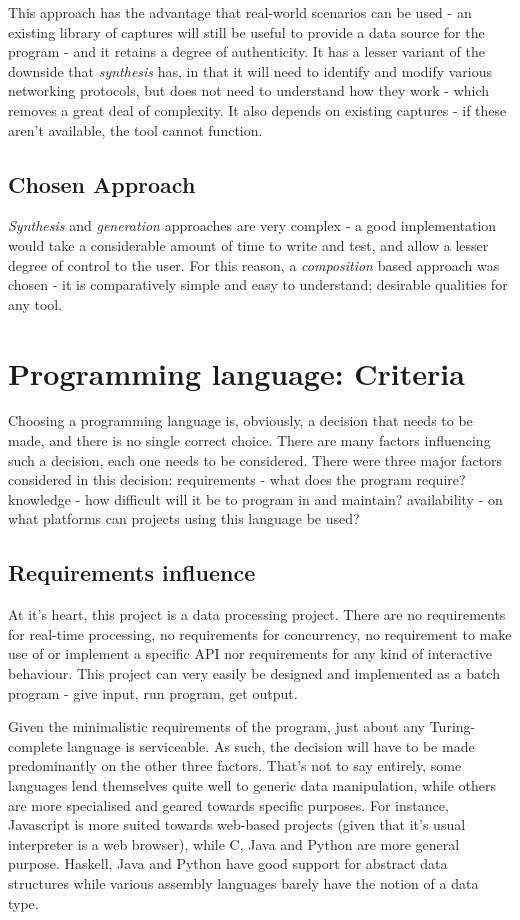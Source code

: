 \documentclass[10pt,a4paper,notitlepage]{report}
\begin{document}
This approach has the advantage that real-world scenarios can be used - an existing library of captures will still be useful to provide a data source for the program - and it retains a degree of authenticity. It has a lesser variant of the downside that \emph{synthesis} has, in that it will need to identify and modify various networking protocols, but does not need to understand how they work - which removes a great deal of complexity. It also depends on existing captures - if these aren't available, the tool cannot function.

\subsection{Chosen Approach}
\emph{Synthesis} and \emph{generation} approaches are very complex - a good implementation would take a considerable amount of time to write and test, and allow a lesser degree of control to the user. For this reason, a \emph{composition} based approach was chosen - it is comparatively simple and easy to understand; desirable qualities for any tool.

\section{Programming language: Criteria}
Choosing a programming language is, obviously, a decision that needs to be made, and there is no single correct choice. There are many factors influencing such a decision, each one needs to be considered. There were three major factors considered in this decision: requirements - what does the program require? knowledge - how difficult will it be to program in and maintain? availability - on what platforms can projects using this language be used?

\subsection{Requirements influence}
At it's heart, this project is a data processing project. There are no requirements for real-time processing, no requirements for concurrency, no requirement to make use of or implement a specific API nor requirements for any kind of interactive behaviour. This project can very easily be designed and implemented as a batch program - give input, run program, get output.

Given the minimalistic requirements of the program, just about any Turing-complete language is serviceable. As such, the decision will have to be made predominantly on the other three factors. That's not to say entirely, some languages lend themselves quite well to generic data manipulation, while others are more specialised and geared towards specific purposes. For instance, Javascript is more suited towards web-based projects (given that it's usual interpreter is a web browser), while C, Java and Python are more general purpose. Haskell, Java and Python have good support for abstract data structures while various assembly languages barely have the notion of a data type.
\end{document}

